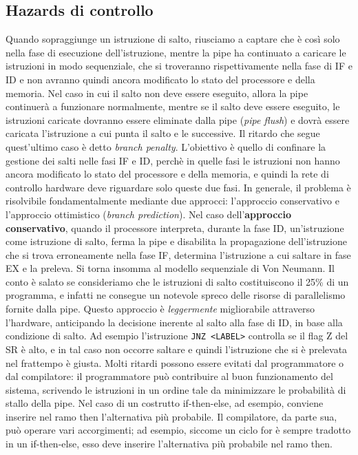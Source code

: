 \subsection{Hazards di controllo} \label{subsec:control_hazards}
Quando sopraggiunge un istruzione di salto, riusciamo a captare che è così solo nella fase di esecuzione dell'istruzione, mentre la pipe ha continuato a caricare le istruzioni in modo sequenziale, che si troveranno rispettivamente nella fase di IF e ID e non avranno quindi ancora modificato lo stato del processore e della memoria. Nel caso in cui il salto non deve essere eseguito, allora la pipe continuerà a funzionare normalmente, mentre se il salto deve essere eseguito, le istruzioni caricate dovranno essere eliminate dalla pipe (\textit{pipe flush}) e dovrà essere caricata l'istruzione a cui punta il salto e le successive. Il ritardo che segue quest'ultimo caso è detto \textit{branch penalty}. L'obiettivo è quello di confinare la gestione dei salti nelle fasi IF e ID, perchè in quelle fasi le istruzioni non hanno ancora modificato lo stato del processore e della memoria, e quindi la rete di controllo hardware deve riguardare solo queste due fasi.
In generale, il problema è risolvibile fondamentalmente mediante due approcci: l'approccio conservativo e l'approccio ottimistico (\textit{branch prediction}).
Nel caso dell'\textbf{approccio conservativo}, quando il processore interpreta, durante la fase ID, un'istruzione come istruzione di salto, ferma la pipe e disabilita la propagazione dell'istruzione che si trova erroneamente nella fase IF, determina l'istruzione a cui saltare in fase EX e la preleva. Si torna insomma al modello sequenziale di Von Neumann. Il conto è salato se consideriamo che le istruzioni di salto costituiscono il 25\% di un programma, e infatti ne consegue un notevole spreco delle risorse di parallelismo fornite dalla pipe. Questo approccio è \textit{leggermente} migliorabile attraverso l'hardware, anticipando la decisione inerente al salto alla fase di ID, in base alla condizione di salto. Ad esempio l'istruzione \lstinline|JNZ <LABEL>| controlla se il flag Z del SR è alto, e in tal caso non occorre saltare e quindi l'istruzione che si è prelevata nel frattempo è giusta. Molti ritardi possono essere  evitati dal programmatore o dal compilatore: il programmatore può contribuire al buon funzionamento del sistema, scrivendo le istruzioni in un ordine tale da minimizzare le probabilità di stallo della pipe. Nel caso di un costrutto if-then-else, ad esempio, conviene inserire nel ramo then l'alternativa più probabile. Il compilatore, da parte sua, può operare vari accorgimenti; ad esempio, siccome un ciclo for è sempre tradotto in un if-then-else, esso deve inserire l'alternativa più probabile nel ramo then.
